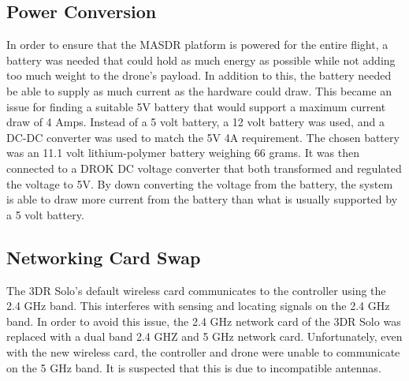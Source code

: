 \subsection{Power Conversion}
In order to ensure that the MASDR platform is powered for the entire flight, a battery was needed that could hold as much energy as possible while not adding too much weight to the drone’s payload. In addition to this, the battery needed be able to supply as much current as the hardware could draw. This became an issue for finding a suitable 5V battery that would support a maximum current draw of 4 Amps. Instead of a 5 volt battery, a 12 volt battery was used, and a DC-DC converter was used to match the 5V 4A requirement. The chosen battery was an 11.1 volt lithium-polymer battery weighing 66 grams. It was then connected to a DROK DC voltage converter that both transformed and regulated the voltage to 5V. By down converting the voltage from the battery, the system is able to draw more current from the battery than what is usually supported by a 5 volt battery.
\subsection{Networking Card Swap}
The 3DR Solo’s default wireless card communicates to the controller using the 2.4 GHz band. This interferes with sensing and locating signals on the 2.4 GHz band. In order to avoid this issue, the 2.4 GHz network card of the 3DR Solo was replaced with a dual band 2.4 GHZ and 5 GHz network card. Unfortunately, even with the new wireless card, the controller and drone were unable to communicate on the 5 GHz band. It is suspected that this is due to incompatible antennas.
